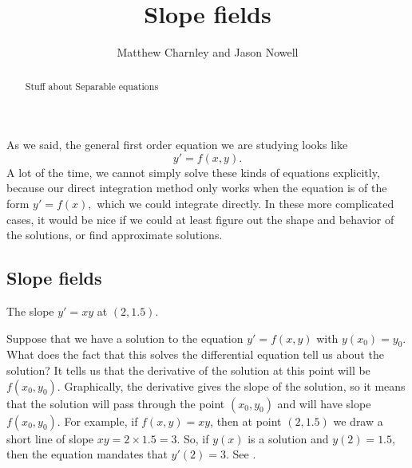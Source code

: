 \documentclass{ximera}
\title{Slope fields}
\author{Matthew Charnley and Jason Nowell}
\begin{document}
\begin{abstract}
    Stuff about Separable equations
\end{abstract}
\maketitle


\label{slopefields:section}



%

As we said, the general first order equation we are studying looks like
\begin{equation*}
    y' = f(x,y).
\end{equation*}
A lot of the time, we cannot simply solve these kinds of equations explicitly, because our direct integration method only works when the equation is of the form $y' = f(x),$ which we could integrate directly. In these more complicated cases, it would be nice if we could at least figure out the shape and behavior of the solutions, or find approximate solutions.

\subsection{Slope fields}

\begin{mywrapfig}{2.75in}
    \capstart
    \caption{The slope $y'=xy$ at $(2,1.5)$.\label{1.3:fig0}}
\end{mywrapfig}

Suppose that we have a solution to the equation $y' = f(x,y)$ with $y(x_0) = y_0$. What does the fact that this solves the differential equation tell us about the solution?
 It tells us that the derivative of the solution at this point will be $f(x_0, y_0)$. Graphically, the derivative gives the slope of the solution, so it means that the solution will pass through the point $(x_0, y_0)$ and will have slope $f(x_0, y_0)$. For example, if $f(x,y) = xy$, then at point $(2,1.5)$ we draw a short line of slope $xy = 2 \times 1.5 = 3$.  So, if $y(x)$ is a solution and $y(2) = 1.5$, then the equation mandates that $y'(2) = 3$. See .
\end{document}
